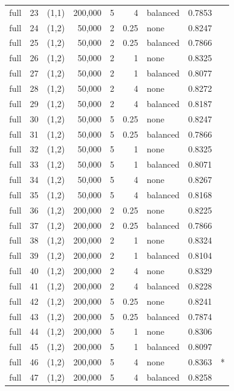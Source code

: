 \documentclass[10pt,a4paper]{article}
\begin{document}
{\begin{longtable}{@{}llrrrrlrl@{}}
full & 23 & (1,1) & 200,000 & 5 & 4 & balanced & 0.7853 &  \\
full & 24 & (1,2) & 50,000 & 2 & 0.25 & none & 0.8247 &  \\
full & 25 & (1,2) & 50,000 & 2 & 0.25 & balanced & 0.7866 &  \\
full & 26 & (1,2) & 50,000 & 2 & 1 & none & 0.8325 &  \\
full & 27 & (1,2) & 50,000 & 2 & 1 & balanced & 0.8077 &  \\
full & 28 & (1,2) & 50,000 & 2 & 4 & none & 0.8272 &  \\
full & 29 & (1,2) & 50,000 & 2 & 4 & balanced & 0.8187 &  \\
full & 30 & (1,2) & 50,000 & 5 & 0.25 & none & 0.8247 &  \\
full & 31 & (1,2) & 50,000 & 5 & 0.25 & balanced & 0.7866 &  \\
full & 32 & (1,2) & 50,000 & 5 & 1 & none & 0.8325 &  \\
full & 33 & (1,2) & 50,000 & 5 & 1 & balanced & 0.8071 &  \\
full & 34 & (1,2) & 50,000 & 5 & 4 & none & 0.8267 &  \\
full & 35 & (1,2) & 50,000 & 5 & 4 & balanced & 0.8168 &  \\
full & 36 & (1,2) & 200,000 & 2 & 0.25 & none & 0.8225 &  \\
full & 37 & (1,2) & 200,000 & 2 & 0.25 & balanced & 0.7866 &  \\
full & 38 & (1,2) & 200,000 & 2 & 1 & none & 0.8324 &  \\
full & 39 & (1,2) & 200,000 & 2 & 1 & balanced & 0.8104 &  \\
full & 40 & (1,2) & 200,000 & 2 & 4 & none & 0.8329 &  \\
full & 41 & (1,2) & 200,000 & 2 & 4 & balanced & 0.8228 &  \\
full & 42 & (1,2) & 200,000 & 5 & 0.25 & none & 0.8241 &  \\
full & 43 & (1,2) & 200,000 & 5 & 0.25 & balanced & 0.7874 &  \\
full & 44 & (1,2) & 200,000 & 5 & 1 & none & 0.8306 &  \\
full & 45 & (1,2) & 200,000 & 5 & 1 & balanced & 0.8097 &  \\
full & 46 & (1,2) & 200,000 & 5 & 4 & none & 0.8363 & * \\
full & 47 & (1,2) & 200,000 & 5 & 4 & balanced & 0.8258 &  \\
\end{longtable}
}
\end{document}
